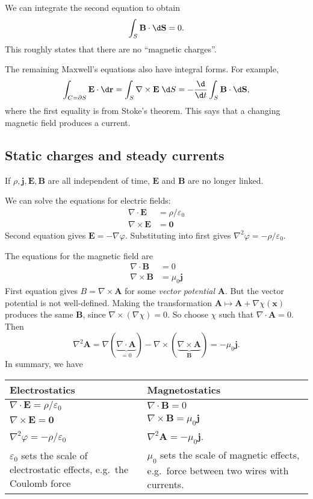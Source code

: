 \documentclass[a4paper]{article}
\begin{document}
We can integrate the second equation to obtain
\[
  \int_S \mathbf{B}\cdot \d \mathbf{S} = 0.
\]
This roughly states that there are no ``magnetic charges''.

The remaining Maxwell's equations also have integral forms. For example,
\[
  \int_{C = \partial S} \mathbf{E}\cdot \d \mathbf{r} = \int_S \nabla \times \mathbf{E}\;\d S = -\frac{\d }{\d t}\int_S \mathbf{B}\cdot \d \mathbf{S},
\]
where the first equality is from Stoke's theorem. This says that a changing magnetic field produces a current.

\subsection{Static charges and steady currents}
If $\rho, \mathbf{j}, \mathbf{E}, \mathbf{B}$ are all independent of time, $\mathbf{E}$ and $\mathbf{B}$ are no longer linked.

We can solve the equations for electric fields:
\begin{align*}
  \nabla\cdot \mathbf{E} &= \rho/\varepsilon_0\\
  \nabla\times \mathbf{E} &= \mathbf{0}
\end{align*}
Second equation gives $\mathbf{E} = -\nabla \varphi$. Substituting into first gives $\nabla^2 \varphi = -\rho/\varepsilon_0$.

The equations for the magnetic field are
\begin{align*}
  \nabla\cdot \mathbf{B} &= 0\\
  \nabla\times \mathbf{B} &= \mu_0 \mathbf{j}
\end{align*}
First equation gives $B = \nabla \times \mathbf{A}$ for some \emph{vector potential} $\mathbf{A}$. But the vector potential is not well-defined. Making the transformation $\mathbf{A}\mapsto \mathbf{A} + \nabla \chi(\mathbf{x})$ produces the same $\mathbf{B}$, since $\nabla\times (\nabla \chi) = 0$. So choose $\chi$ such that $\nabla\cdot \mathbf{A} = 0$. Then
\[
  \nabla^2 \mathbf{A} = \nabla(\underbrace{\nabla\cdot \mathbf{A}}_{=0}) - \nabla\times (\underbrace{\nabla\times \mathbf{A}}_{\mathbf{B}}) = -\mu_0 \mathbf{j}.
\]
In summary, we have
\begin{center}
  \begin{tabularx}{\textwidth}{XX}
    \toprule
    Electrostatics & Magnetostatics\\
    \midrule
    $\nabla\cdot \mathbf{E} = \rho/\varepsilon_0$ & $\nabla\cdot \mathbf{B} = 0$\\
    $\nabla\times \mathbf{E} = \mathbf{0}$ & $\nabla\times \mathbf{B} = \mu_0 \mathbf{j}$\\
    $\nabla^2 \varphi = -\rho/\varepsilon_0$ & $\nabla^2 \mathbf{A} = -\mu_0 \mathbf{j}$.\\
    $\varepsilon_0$ sets the scale of electrostatic effects, e.g.\ the Coulomb force & $\mu_0$ sets the scale of magnetic effects, e.g.\ force between two wires with currents.\\
    \bottomrule
  \end{tabularx}
\end{center}
\end{document}
